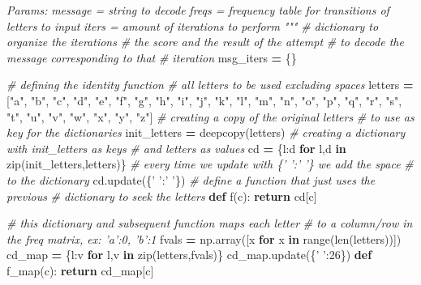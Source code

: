 \documentclass[]{article}
\newenvironment{Shaded}{\begin{snugshade}}{\end{snugshade}}
\newcommand{\BuiltInTok}[1]{#1}
\newcommand{\CommentTok}[1]{\textcolor[rgb]{0.56,0.35,0.01}{\textit{#1}}}
\newcommand{\ControlFlowTok}[1]{\textcolor[rgb]{0.13,0.29,0.53}{\textbf{#1}}}
\newcommand{\DecValTok}[1]{\textcolor[rgb]{0.00,0.00,0.81}{#1}}
\newcommand{\KeywordTok}[1]{\textcolor[rgb]{0.13,0.29,0.53}{\textbf{#1}}}
\newcommand{\NormalTok}[1]{#1}
\newcommand{\OperatorTok}[1]{\textcolor[rgb]{0.81,0.36,0.00}{\textbf{#1}}}
\newcommand{\StringTok}[1]{\textcolor[rgb]{0.31,0.60,0.02}{#1}}
\begin{document}
\begin{Shaded}
\begin{Highlighting}[]
\CommentTok{    Params:}
\CommentTok{    message = string to decode}
\CommentTok{    freqs = frequency table for transitions of letters}
\CommentTok{            to input}
\CommentTok{    iters = amount of iterations to perform}
\CommentTok{    """}
    \CommentTok{# dictionary to organize the iterations}
    \CommentTok{# the score and the result of the attempt}
    \CommentTok{# to decode the message corresponding to that}
    \CommentTok{# iteration}
\NormalTok{    msg_iters }\OperatorTok{=}\NormalTok{ \{\}}

    \CommentTok{# defining the identity function}
    \CommentTok{# all letters to be used excluding spaces}
\NormalTok{    letters }\OperatorTok{=}\NormalTok{ [}\StringTok{"a"}\NormalTok{, }\StringTok{"b"}\NormalTok{, }\StringTok{"c"}\NormalTok{, }\StringTok{"d"}\NormalTok{,}
                \StringTok{"e"}\NormalTok{, }\StringTok{"f"}\NormalTok{, }\StringTok{"g"}\NormalTok{, }\StringTok{"h"}\NormalTok{, }
                \StringTok{"i"}\NormalTok{, }\StringTok{"j"}\NormalTok{, }\StringTok{"k"}\NormalTok{, }\StringTok{"l"}\NormalTok{, }
                \StringTok{"m"}\NormalTok{, }\StringTok{"n"}\NormalTok{, }\StringTok{"o"}\NormalTok{, }\StringTok{"p"}\NormalTok{, }
                \StringTok{"q"}\NormalTok{, }\StringTok{"r"}\NormalTok{, }\StringTok{"s"}\NormalTok{, }\StringTok{"t"}\NormalTok{, }
                \StringTok{"u"}\NormalTok{, }\StringTok{"v"}\NormalTok{, }\StringTok{"w"}\NormalTok{, }\StringTok{"x"}\NormalTok{, }
                \StringTok{"y"}\NormalTok{, }\StringTok{"z"}\NormalTok{]}
    \CommentTok{# creating a copy of the original letters}
    \CommentTok{# to use as key for the dictionaries}
\NormalTok{    init_letters }\OperatorTok{=}\NormalTok{ deepcopy(letters)}
    \CommentTok{# creating a dictionary with init_letters as keys}
    \CommentTok{# and letters as values}
\NormalTok{    cd }\OperatorTok{=}\NormalTok{ \{l:d }\ControlFlowTok{for}\NormalTok{ l,d }\KeywordTok{in} \BuiltInTok{zip}\NormalTok{(init_letters,letters)\}}
    \CommentTok{# every time we update with \{' ':' '\} we add the space}
    \CommentTok{# to the dictionary}
\NormalTok{    cd.update(\{}\StringTok{' '}\NormalTok{:}\StringTok{' '}\NormalTok{\})}
    \CommentTok{# define a function that just uses the previous}
    \CommentTok{# dictionary to seek the letters}
    \KeywordTok{def}\NormalTok{ f(c):}
        \ControlFlowTok{return}\NormalTok{ cd[c]}
    
    \CommentTok{# this dictionary and subsequent function maps each letter}
    \CommentTok{# to a column/row in the freq matrix, ex: 'a':0, 'b':1 }
\NormalTok{    fvals }\OperatorTok{=}\NormalTok{ np.array([x }\ControlFlowTok{for}\NormalTok{ x }\KeywordTok{in} \BuiltInTok{range}\NormalTok{(}\BuiltInTok{len}\NormalTok{(letters))])}
\NormalTok{    cd_map }\OperatorTok{=}\NormalTok{ \{l:v }\ControlFlowTok{for}\NormalTok{ l,v }\KeywordTok{in} \BuiltInTok{zip}\NormalTok{(letters,fvals)\}}
\NormalTok{    cd_map.update(\{}\StringTok{' '}\NormalTok{:}\DecValTok{26}\NormalTok{\})}
    \KeywordTok{def}\NormalTok{ f_map(c):}
        \ControlFlowTok{return}\NormalTok{ cd_map[c]}


\end{Highlighting}
\end{Shaded}
\end{document}
